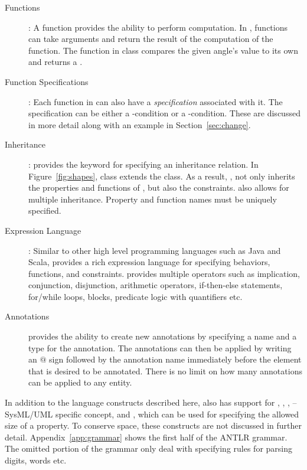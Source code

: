 \begin{description}
\item [Functions]: A function provides the ability to perform
  computation. In \Klang{}, functions can take arguments and return
  the result of the computation of the function. The 
  function in class  compares the given angle's value to
  its own and returns a .

\item [Function Specifications]: Each function in \Klang{} can also
  have a \emph{specification} associated with it. The specification
  can be either a -condition or a
  -condition. These are discussed in more detail along with
  an example in Section~\ref{sec:change}.
  
\item [Inheritance]: \Klang{} provides the  keyword for
  specifying an inheritance relation. In Figure~\ref{fig:shapes},
   class extends the  class. As a result,
  , not only inherits the properties and functions of
  , but also the constraints. \Klang{} also allows for
  multiple inheritance. Property and function names must be uniquely
  specified.

\item [Expression Language]: Similar to other high level programming
  languages such as Java and Scala, \Klang{} provides a rich
  expression language for specifying behaviors, functions, and
  constraints. \Klang{} provides multiple operators such as
  implication, conjunction, disjunction, arithmetic operators,
  if-then-else statements, for/while loops, blocks, predicate logic
  with quantifiers etc. 

\item [Annotations] \Klang{} provides the ability to create new
  annotations by specifying a name and a type for the annotation. The
  annotations can then be applied by writing an $@$ sign followed by
  the annotation name immediately before the element that is desired
  to be annotated. There is no limit on how many annotations can be
  applied to any entity. 

\end{description}

In addition to the language constructs described here, \Klang{} also
has support for , , ,
 -- SysML/UML specific concept, and
, which can be used for specifying the allowed
size of a property. To conserve space, these constructs are not
discussed in further detail. Appendix~\ref{app:grammar} shows the
first half of the \Klang{} ANTLR grammar. The omitted portion of the
grammar only deal with specifying rules for parsing digits, words etc.

